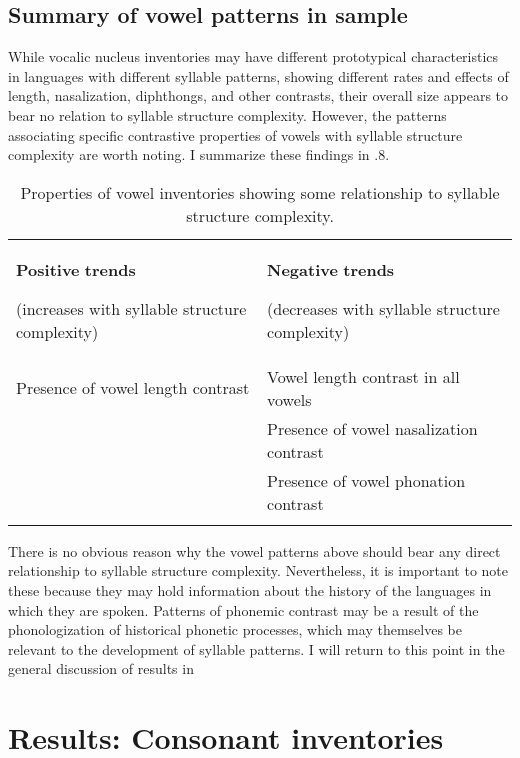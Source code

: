 \subsection{Summary of vowel patterns in sample}\label{sec:4.3.6}

  While vocalic nucleus inventories may have different prototypical characteristics in languages with different syllable patterns, showing different rates and effects of length, nasalization, diphthongs, and other contrasts, their overall size appears to bear no relation to syllable structure complexity. However, the patterns associating specific contrastive properties of vowels with syllable structure complexity are worth noting. I summarize these findings in .8.

\begin{table}
\begin{tabularx}{\textwidth}{XX}
\lsptoprule

\textbf{Positive} \textbf{trends}

(increases with syllable structure complexity) & \textbf{Negative} \textbf{trends}

(decreases with syllable structure complexity)\\
Presence of vowel length contrast & Vowel length contrast in all vowels\\
& Presence of vowel nasalization contrast\\
& Presence of vowel phonation contrast\\
\lspbottomrule
\end{tabularx}
\caption{\label{4.8}Properties of vowel inventories showing some relationship to syllable structure complexity.}
\end{table}

  There is no obvious reason why the vowel patterns above should bear any direct relationship to syllable structure complexity. Nevertheless, it is important to note these because they may hold information about the history of the languages in which they are spoken. Patterns of phonemic contrast may be a result of the phonologization of historical phonetic processes, which may themselves be relevant to the development of syllable patterns. I will return to this point in the general discussion of results in 

\section{Results: Consonant inventories}\label{sec:4.4}
